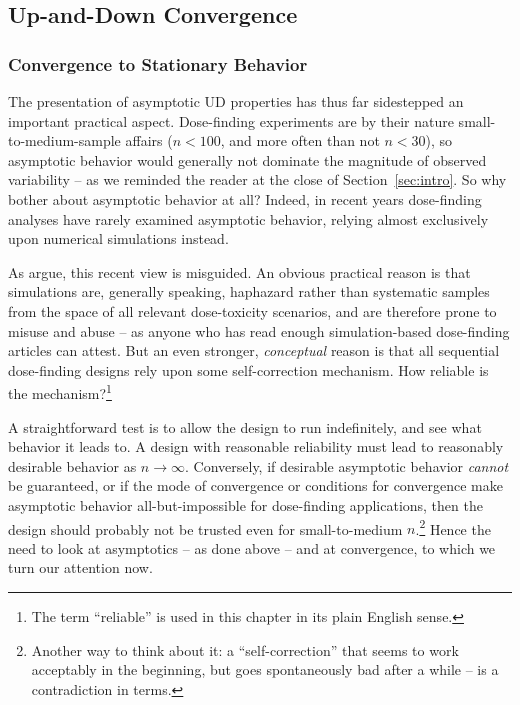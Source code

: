 \subsection{Up-and-Down Convergence}

\subsubsection{Convergence to Stationary Behavior}\label{sec:geom}

The presentation of asymptotic UD properties has thus far sidestepped an important practical aspect. Dose-finding experiments are by their nature small-to-medium-sample affairs ($n<100$, and more often than not $n<30$), so asymptotic behavior would generally not dominate the magnitude of observed variability -- as we reminded the reader at the close of Section~\ref{sec:intro}. So why bother about asymptotic behavior at all? Indeed, in recent years dose-finding analyses have rarely examined asymptotic behavior, relying almost exclusively upon numerical simulations instead.

As \cite{oron:azri:hoff:dose:2011} argue, this recent view is misguided. An obvious practical reason is that simulations are, generally speaking, haphazard rather than systematic samples from the space of all relevant dose-toxicity scenarios, and are therefore prone to misuse and abuse -- as anyone who has read enough simulation-based dose-finding articles can attest. But an even stronger,  \emph{conceptual} reason is that all sequential dose-finding designs rely upon some self-correction mechanism. How reliable is the mechanism?\footnote{The term ``reliable'' is used in this chapter in its plain English sense.}

A straightforward test is to allow the design to run indefinitely, and see what behavior it leads to. A design with reasonable reliability must lead to reasonably desirable behavior as $n\to\infty$. Conversely, if desirable asymptotic behavior \emph{cannot} be guaranteed, or if the mode of convergence or conditions for convergence make asymptotic behavior all-but-impossible for dose-finding applications, then the design should probably not be trusted even for small-to-medium $n$.\footnote{Another way to think about it: a ``self-correction'' that seems to work acceptably in the beginning, but goes spontaneously bad after a while -- is a contradiction in terms.} Hence the need to look at asymptotics -- as done above -- and at convergence, to which we turn our attention now.

